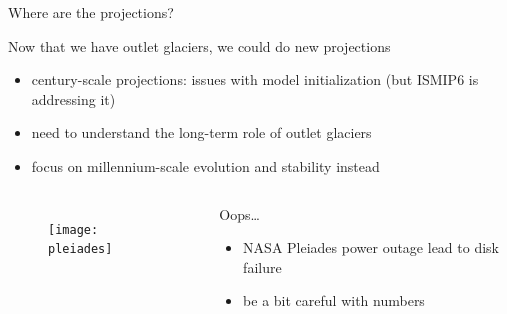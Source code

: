 \documentclass[hide notes,intlimits]{beamer}
\begin{document}
  {
} 

\begin{frame}{Where are the projections?}
  \begin{block}{Now that we have outlet glaciers, we could do new projections}
    \begin{itemize}
    \item century-scale projections: issues with model initialization (but ISMIP6 is addressing it)
    \item need to understand the long-term role of outlet glaciers
    \item \alert{focus on millennium-scale evolution and stability instead}
    \end{itemize}
  \end{block}
  \begin{columns}
    \column[T]{5cm}
    \begin{figure}
      \texttt{[image: pleiades]}
    \end{figure}
    \column[T]{5cm}
    \begin{block}{Oops\ldots}
      \begin{itemize}
      \item NASA Pleiades power outage lead to disk failure
      \item be a bit careful with numbers
      \end{itemize}
    \end{block}
  \end{columns}
\end{frame}
\end{document}
